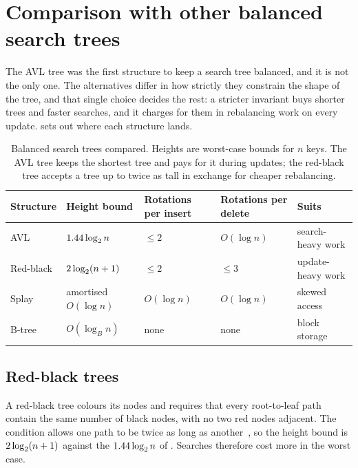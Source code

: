 \section{Comparison with other balanced search trees}
\label{sec:comparison}

The AVL tree was the first structure to keep a search tree balanced, and it is
not the only one. The alternatives differ in how strictly they constrain the
shape of the tree, and that single choice decides the rest: a stricter invariant
buys shorter trees and faster searches, and it charges for them in rebalancing
work on every update.  sets out where each structure lands.

\begin{table}[t]
  \centering
  \caption{Balanced search trees compared. Heights are worst-case bounds for $n$
  keys. The AVL tree keeps the shortest tree and pays for it during updates; the
  red-black tree accepts a tree up to twice as tall in exchange for cheaper
  rebalancing.}
  \label{tab:comparison}
  \begin{tabular}{@{}lllll@{}}
    \toprule
    Structure & Height bound & Rotations per insert & Rotations per delete
      & Suits \\
    \midrule
    AVL         & $1.44\log_{2}n$        & $\le 2$    & $O(\log n)$
      & search-heavy work \\
    Red-black   & $2\log_{2}(n+1)$        & $\le 2$    & $\le 3$
      & update-heavy work \\
    Splay       & amortised $O(\log n)$ & $O(\log n)$ & $O(\log n)$
      & skewed access \\
    B-tree      & $O(\log_B n)$       & none       & none
      & block storage \\
    \bottomrule
  \end{tabular}
\end{table}

\subsection{Red-black trees}

A red-black tree colours its nodes and requires that every root-to-leaf path
contain the same number of black nodes, with no two red nodes adjacent. The
condition allows one path to be twice as long as another~\cite{clrs}, so the height bound is
$2\log_{2}(n+1)$ against the $1.44\log_{2}n$ of . Searches
therefore cost more in the worst case.

